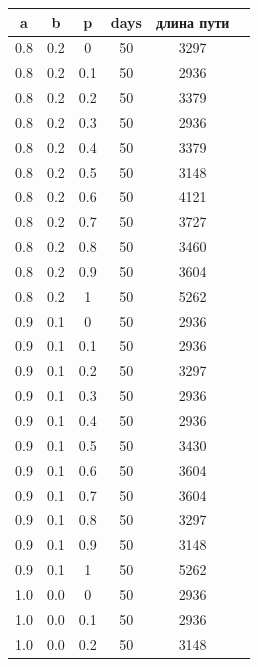 \documentclass[12pt]{report}
\begin{document}
\begin{table}[!h]
	\begin{center}
		\begin{tabular}{c@{\hspace{7mm}}c@{\hspace{7mm}}c@{\hspace{7mm}}c@{\hspace{7mm}}c@{\hspace{7mm}}c}
			\toprule
			a        &b      &p      &days &длина пути \\
			\midrule
			0.8     &0.2    &0      &50    &3297\\
			0.8     &0.2    &0.1    &50    &2936\\
			0.8     &0.2    &0.2    &50    &3379\\
			0.8     &0.2    &0.3    &50    &2936\\
			0.8     &0.2    &0.4    &50    &3379\\
			0.8     &0.2    &0.5    &50    &3148\\
			0.8     &0.2    &0.6    &50    &4121\\
			0.8     &0.2    &0.7    &50    &3727\\
			0.8     &0.2    &0.8    &50    &3460\\
			0.8     &0.2    &0.9    &50    &3604\\
			0.8     &0.2    &1      &50     &5262\\
			\midrule
			0.9     &0.1    &0      &50    &2936\\
			0.9     &0.1    &0.1    &50    &2936\\
			0.9     &0.1    &0.2    &50    &3297\\
			0.9     &0.1    &0.3    &50    &2936\\
			0.9     &0.1    &0.4    &50    &2936\\
			0.9     &0.1    &0.5    &50    &3430\\
			0.9     &0.1    &0.6    &50    &3604\\
			0.9     &0.1    &0.7    &50    &3604\\
			0.9     &0.1    &0.8    &50    &3297\\
			0.9     &0.1    &0.9    &50   &3148\\
			0.9     &0.1    &1      &50    &5262\\
			\midrule
			1.0     &0.0    &0      &50    &2936\\
			1.0     &0.0    &0.1    &50    &2936\\
			1.0     &0.0    &0.2    &50    &3148\\

\end{tabular}
\end{center}
\end{table}
\end{document}
